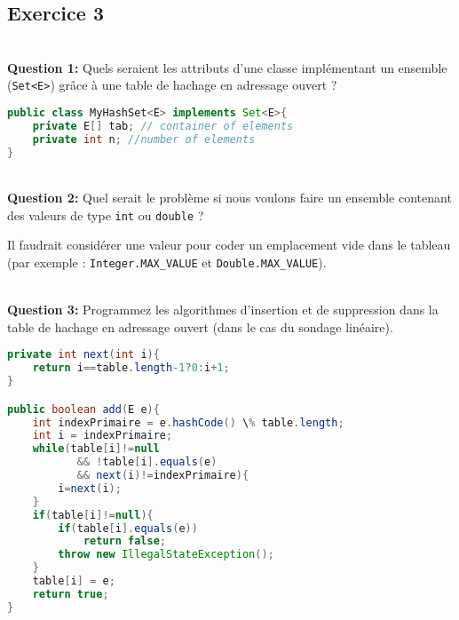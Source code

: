 \documentclass[a4paper, 10pt]{ustl-tdtp}
\begin{document}
\subsection*{Exercice 3}

~\\ \textbf{Question 1:} Quels seraient les attributs d'une classe
implémentant un ensemble (\texttt{Set<E>}) grâce à une table de hachage
en adressage ouvert ?
\begin{solution}
{\color{red}
\begin{lstlisting}[language=Java]
public class MyHashSet<E> implements Set<E>{
    private E[] tab; // container of elements
    private int n; //number of elements
}
\end{lstlisting}
}
\end{solution}

~\\ \textbf{Question 2:} Quel serait le problème si nous voulons faire
un ensemble contenant des valeurs de type \texttt{int}  ou
\texttt{double}  ?

\begin{solution}
{\color{red}
Il faudrait considérer une valeur pour coder un emplacement vide dans
le tableau (par exemple : \texttt{Integer.MAX_VALUE} et \texttt{Double.MAX_VALUE}).
}
\end{solution}


~\\ \textbf{Question 3:} Programmez les algorithmes d'insertion et de suppression dans la table de hachage en adressage ouvert (dans le cas du sondage linéaire).

\begin{solution}
{\color{red}
\begin{lstlisting}[language=Java]
private int next(int i){
    return i==table.length-1?0:i+1;
}

public boolean add(E e){
    int indexPrimaire = e.hashCode() \% table.length;
    int i = indexPrimaire;
    while(table[i]!=null 
           && !table[i].equals(e)
           && next(i)!=indexPrimaire){
        i=next(i);
    }
    if(table[i]!=null){
        if(table[i].equals(e))
            return false;
        throw new IllegalStateException();
    }
    table[i] = e;
    return true;
}
\end{lstlisting}
}
\end{solution}
\end{document}
